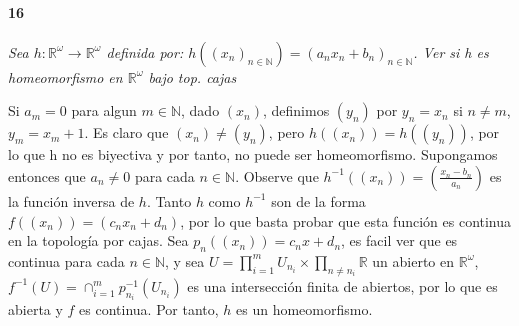 \documentclass[12pt]{article}
\begin{document}
\paragraph{16}
\textit{Sea $h:\mathbb{R}^\omega\rightarrow\mathbb{R}^\omega$ definida por: $h((x_n)_{n\in\mathbb{N}})=(a_n x_n +b_n)_{n\in\mathbb{N}}$. Ver si h es homeomorfismo en $\mathbb{R}^\omega$ bajo top. cajas}

Si $a_m=0$ para algun $m \in \mathbb{N}$, dado $(x_n)$, definimos $(y_n)$ por $y_n=x_n$ si $n \neq m$, $y_m=x_m+1$. Es claro que $(x_n) \neq (y_n)$, pero $h((x_n))=h((y_n))$, por lo que h no es biyectiva y por tanto, no puede ser homeomorfismo.
Supongamos entonces que $a_n \neq 0$ para cada $n \in \mathbb{N}$. Observe que $h^{-1}((x_n))=(\frac{x_n-b_n}{a_n})$ es la función inversa de $h$. Tanto $h$ como $h^{-1}$ son de la forma $f((x_n))=(c_n x_n+d_n)$, por lo que basta probar que esta función
es continua en la topología por cajas. Sea $p_n((x_n))=c_nx+d_n$, es facil ver que es continua para cada $n \in \mathbb{N}$, y sea $U=\prod_{i=1}^{m} U_{n_i} \times \prod_{n\neq n_i} \mathbb{R}$ un abierto en $\mathbb{R}^\omega$,  $f^{-1}(U)=\cap_{i=1}^{m} p^{-1}_{n_i}(U_{n_i})$ es una
intersección finita de abiertos, por lo que es abierta y $f$ es continua. Por tanto, $h$ es un homeomorfismo.
\end{document}
